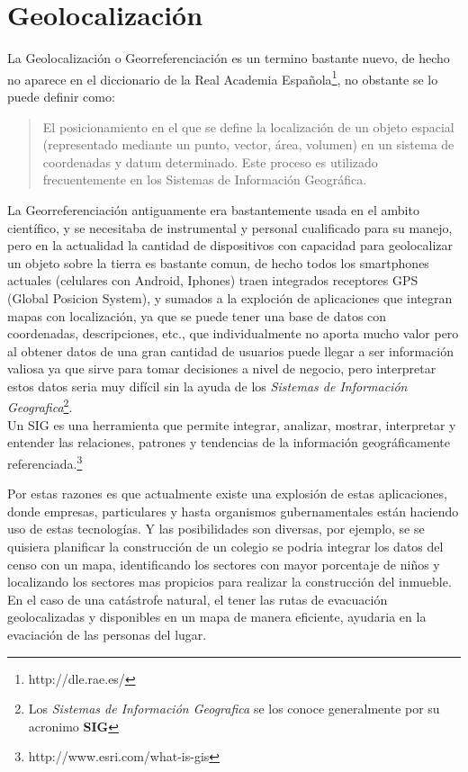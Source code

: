 \section{Geolocalizaci\'on} %
\label{sec:geolocalizacion}
  La Geolocalizaci\'on o Georreferenciación es un termino bastante nuevo, de hecho no aparece en el diccionario de la Real Academia Espa\~nola\footnote{http://dle.rae.es/}, no obstante se lo puede definir como:

  \begin{quote}
    El posicionamiento en el que se define la localización de un objeto espacial (representado mediante un punto, vector, área, volumen) en un sistema de coordenadas y datum determinado. Este proceso es utilizado frecuentemente en los Sistemas de Información Geográfica.\cite{Georreferenciacion}
  \end{quote}


  La Georreferenciación antiguamente era bastantemente usada en el ambito científico, y se necesitaba de instrumental y personal cualificado para su manejo, pero en la actualidad la cantidad de dispositivos con capacidad para geolocalizar un objeto sobre la tierra es bastante comun, de hecho todos los smartphones actuales (celulares con Android, Iphones) traen integrados receptores GPS (Global Posicion System),  y sumados a la exploci\'on de aplicaciones  que integran mapas con localizaci\'on, ya que se puede tener una base de datos con coordenadas, descripciones, etc., que individualmente no aporta mucho valor pero al obtener datos de una gran cantidad de usuarios puede llegar a ser informaci\'on valiosa ya que sirve para tomar decisiones a nivel de negocio, pero interpretar estos datos seria muy difícil sin la ayuda de los \emph{Sistemas de Informaci\'on Geografica}\footnote{Los \emph{Sistemas de Informaci\'on Geografica} se los conoce generalmente por su acronimo \textbf{SIG}}.\\

  Un SIG es una herramienta que permite integrar, analizar, mostrar, interpretar y  entender las relaciones, patrones y tendencias de la información geográficamente referenciada.\footnote{http://www.esri.com/what-is-gis}

  Por estas razones es que actualmente existe una explosi\'on de estas aplicaciones, donde empresas, particulares y hasta organismos gubernamentales est\'an haciendo uso de estas tecnologías.
  Y las posibilidades son diversas, por ejemplo, se se quisiera planificar la construcci\'on de un colegio se podria integrar los datos del censo con un mapa, identificando los sectores con mayor porcentaje de ni\~nos y localizando los sectores mas propicios para realizar la construcción del inmueble. En el caso de una catástrofe natural, el tener las rutas de evacuaci\'on geolocalizadas y disponibles en un mapa de manera eficiente,  ayudaria en la evaciaci\'on de las personas del lugar.\\


